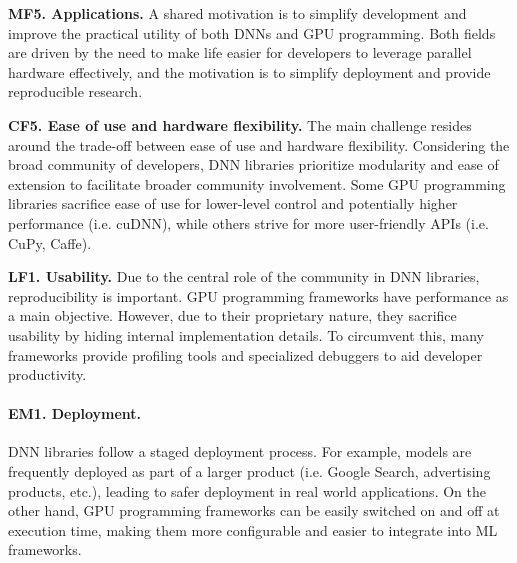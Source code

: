 \textbf{MF5. Applications.}
A shared motivation is to simplify development and improve the practical utility of both DNNs and
GPU programming. Both fields are driven by the need to make life easier for developers to leverage
parallel hardware effectively, and the motivation is to simplify deployment and provide reproducible
research.

\textbf{CF5. Ease of use and hardware flexibility.}
The main challenge resides around the trade-off between ease of use and hardware flexibility.
Considering the broad community of developers, DNN libraries prioritize modularity and ease of
extension to facilitate broader community involvement. Some GPU programming libraries sacrifice
ease of use for lower-level control and potentially higher performance (i.e. cuDNN), while others
strive for more user-friendly APIs (i.e. CuPy, Caffe).

\textbf{LF1. Usability.}
Due to the central role of the community in DNN libraries, reproducibility is important. GPU programming
frameworks have performance as a main objective. However, due to their proprietary nature, they sacrifice
usability by hiding internal implementation details. To circumvent this, many frameworks provide
profiling tools and specialized debuggers to aid developer productivity.



\paragraph{EM1. Deployment.}
DNN libraries follow a staged deployment process. For example, models are frequently deployed as
part of a larger product (i.e. Google Search, advertising products, etc.), leading to safer
deployment in real world applications. On the other hand, GPU programming frameworks can be easily
switched on and off at execution time, making them more configurable and easier to integrate into
ML frameworks.

